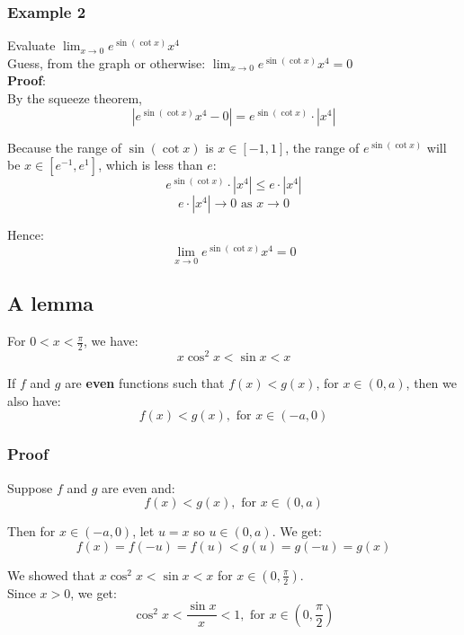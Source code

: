 \documentclass[11pt]{article}
\begin{document}
\subsubsection{Example 2}
\label{sec:org630aea1}
Evaluate \(\lim_{x \rightarrow 0} e^{\sin(\cot x)} x^4\)
\\[0pt]

Guess, from the graph or otherwise: \(\lim_{x \rightarrow 0} e^{\sin(\cot x)} x^4 = 0\)
\\[0pt]

\textbf{Proof}:
\\[0pt]

By the squeeze theorem,
\[|e^{\sin(\cot x)} x^4 - 0| = e^{\sin(\cot x)} \cdot |x^4|\]

Because the range of \(\sin (\cot x)\) is \(x \in [-1, 1]\), the range of \(e^{\sin (\cot x)}\) will be \(x \in [e^{-1}, e^{1}]\), which is less than \(e\):
\[e^{\sin(\cot x)} \cdot |x^4| \leq e \cdot |x^4|\]
\[e \cdot |x^4| \rightarrow 0 \text{ as } x \rightarrow 0\]

Hence:
\[\lim_{x \rightarrow 0} e^{\sin (\cot x)} x^4 = 0\]


\subsection{A lemma}
\label{sec:orgaa498a2}

For \(0 < x < \frac{\pi}{2}\), we have:
\[x \cos^2 x < \sin x < x\]

If \(f\) and \(g\) are \textbf{even} functions such that \(f(x) < g(x)\), for \(x \in (0, a)\), then we also have:
\[f(x) < g(x), \text{ for } x \in (-a, 0)\]

\newpage

\subsubsection{Proof}
\label{sec:org76fada2}

Suppose \(f\) and \(g\) are even and:
\[f(x) < g(x), \text{ for } x \in (0, a)\]

Then for \(x \in (-a, 0)\), let \(u = x\) so \(u \in (0, a)\). We get:
\[f(x) = f(-u) = f(u) < g(u) = g(-u) = g(x)\]

We showed that \(x \cos^2 x < \sin x < x\) for \(x \in (0, \frac{\pi}{2})\).
\\[0pt]

Since \(x > 0\), we get:
\[\cos^2 x < \frac{\sin x}{x} < 1, \text{ for } x \in (0, \frac{\pi}{2})\]
\end{document}
